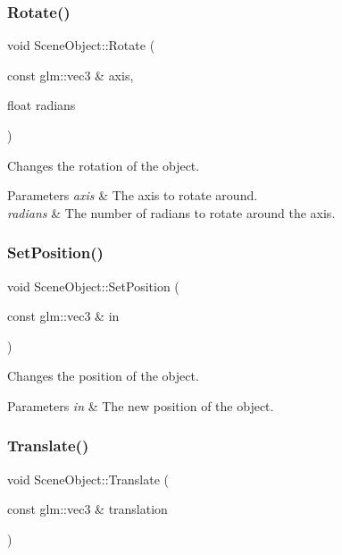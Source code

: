 \subsubsection{\texorpdfstring{Rotate()}{Rotate()}}
{\footnotesize\ttfamily void Scene\+Object\+::\+Rotate (\begin{DoxyParamCaption}\item[{const glm\+::vec3 \&}]{axis,  }\item[{float}]{radians }\end{DoxyParamCaption})}



Changes the rotation of the object. 


\begin{DoxyParams}{Parameters}
{\em axis} & The axis to rotate around. \\
\hline
{\em radians} & The number of radians to rotate around the axis. \\
\hline
\end{DoxyParams}
\hypertarget{class_scene_object_a1903672e77e88a1e220fcfa8e6afc1d4}{}\label{class_scene_object_a1903672e77e88a1e220fcfa8e6afc1d4} 
\subsubsection{\texorpdfstring{Set\+Position()}{SetPosition()}}
{\footnotesize\ttfamily void Scene\+Object\+::\+Set\+Position (\begin{DoxyParamCaption}\item[{const glm\+::vec3 \&}]{in }\end{DoxyParamCaption})}



Changes the position of the object. 


\begin{DoxyParams}{Parameters}
{\em in} & The new position of the object. \\
\hline
\end{DoxyParams}
\hypertarget{class_scene_object_a04868377580069b0ee9d202bdb1b7159}{}\label{class_scene_object_a04868377580069b0ee9d202bdb1b7159} 
\subsubsection{\texorpdfstring{Translate()}{Translate()}}
{\footnotesize\ttfamily void Scene\+Object\+::\+Translate (\begin{DoxyParamCaption}\item[{const glm\+::vec3 \&}]{translation }\end{DoxyParamCaption})}



